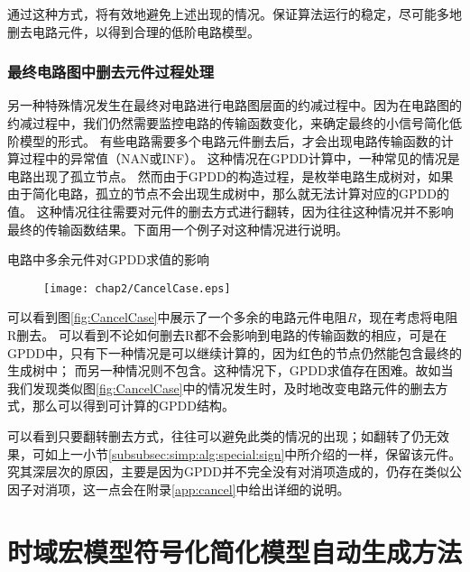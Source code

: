 通过这种方式，将有效地避免上述出现的情况。保证算法运行的稳定，尽可能多地删去电路元件，以得到合理的低阶电路模型。

\subsubsection{最终电路图中删去元件过程处理}
\label{subsubsec:simp:alg:special:reduce}

另一种特殊情况发生在最终对电路进行电路图层面的约减过程中。因为在电路图的约减过程中，我们仍然需要监控电路的传输函数变化，来确定最终的小信号简化低阶模型的形式。
有些电路需要多个电路元件删去后，才会出现电路传输函数的计算过程中的异常值（NAN或INF）。
这种情况在GPDD计算中，一种常见的情况是电路出现了孤立节点。
然而由于GPDD的构造过程，是枚举电路生成树对，如果由于简化电路，孤立的节点不会出现生成树中，那么就无法计算对应的GPDD的值。
这种情况往往需要对元件的删去方式进行翻转，因为往往这种情况并不影响最终的传输函数结果。下面用一个例子对这种情况进行说明。

\begin{exmp}
电路中多余元件对GPDD求值的影响
	
\begin{figure}[!htp]
	\centering
	\texttt{[image: chap2/CancelCase.eps]}
\end{figure}

可以看到图\ref{fig:CancelCase}中展示了一个多余的电路元件电阻$R$，现在考虑将电阻R删去。
可以看到不论如何删去R都不会影响到电路的传输函数的相应，可是在GPDD中，只有下一种情况是可以继续计算的，因为红色的节点仍然能包含最终的生成树中；
而另一种情况则不包含。这种情况下，GPDD求值存在困难。故如当我们发现类似图\ref{fig:CancelCase}中的情况发生时，及时地改变电路元件的删去方式，那么可以得到可计算的GPDD结构。

\end{exmp}

可以看到只要翻转删去方式，往往可以避免此类的情况的出现；如翻转了仍无效果，可如上一小节\ref{subsubsec:simp:alg:special:sign}中所介绍的一样，保留该元件。
究其深层次的原因，主要是因为GPDD并不完全没有对消项造成的，仍存在类似公因子对消项，这一点会在附录\ref{app:cancel}中给出详细的说明。

\section{时域宏模型符号化简化模型自动生成方法}

